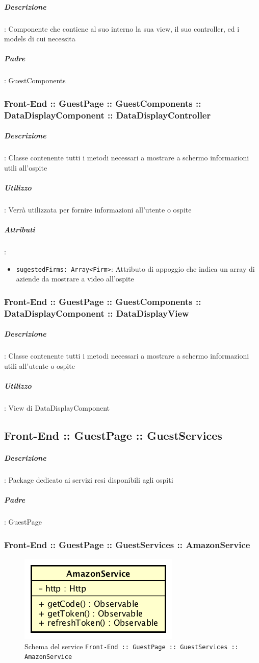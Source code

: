 \documentclass[../ManualeSviluppatore_v1.0.0.tex]{subfiles}
\begin{document}
			\subparagraph{Descrizione}: Componente che contiene al suo interno la sua view, il suo controller, ed i models di cui necessita
			\subparagraph{Padre}: GuestComponents
			
			\subsubsection{Front-End :: GuestPage :: GuestComponents :: DataDisplayComponent :: DataDisplayController}
				\subparagraph{Descrizione}: Classe contenente tutti i metodi necessari a mostrare a schermo informazioni utili all'ospite
				\subparagraph{Utilizzo}: Verrà utilizzata per fornire informazioni all'utente o ospite
				\subparagraph{Attributi}:
				\begin{itemize}
					\item \texttt{sugestedFirms: Array<Firm>}: Attributo di appoggio che indica un array di aziende da mostrare a video all'ospite
				\end{itemize}
			\subsubsection{Front-End :: GuestPage :: GuestComponents :: DataDisplayComponent :: DataDisplayView}

				\subparagraph{Descrizione}: Classe contenente tutti i metodi necessari a mostrare a schermo informazioni utili all'utente o ospite
				\subparagraph{Utilizzo}: View di DataDisplayComponent

	\newpage
	\subsection{Front-End :: GuestPage :: GuestServices}
	
			\subparagraph{Descrizione}: Package dedicato ai servizi resi disponibili agli ospiti 
			\subparagraph{Padre}: GuestPage
		
			\subsubsection{Front-End :: GuestPage :: GuestServices :: AmazonService}
			\begin{figure}[!h]
				\centering
				\includegraphics[scale=0.6]{Architettura/Front-End/GuestPage/GuestServices/AmazonService.png}
				\caption{Schema del service \texttt{Front-End :: GuestPage :: GuestServices :: AmazonService}}
			\end{figure}
\end{document}
